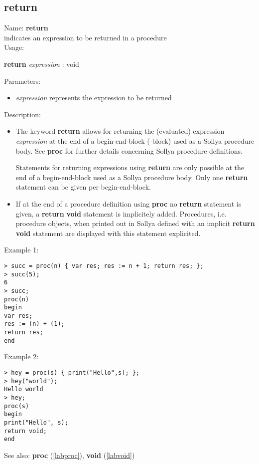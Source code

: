 \subsection{return}
\label{labreturn}
\noindent Name: \textbf{return}\\
indicates an expression to be returned in a procedure\\

\noindent Usage: 
\begin{center}
\textbf{return} \emph{expression} : \textsf{void}\\
\end{center}
Parameters: 
\begin{itemize}
\item \emph{expression} represents the expression to be returned
\end{itemize}
\noindent Description: \begin{itemize}

\item The keyword \textbf{return} allows for returning the (evaluated) expression
   \emph{expression} at the end of a begin-end-block ({}-block) used as a
   Sollya procedure body. See \textbf{proc} for further details concerning
   Sollya procedure definitions.
    
   Statements for returning expressions using \textbf{return} are only possible
    at the end of a begin-end-block used as a Sollya procedure
    body. Only one \textbf{return} statement can be given per begin-end-block.

\item If at the end of a procedure definition using \textbf{proc} no \textbf{return}
   statement is given, a \textbf{return} \textbf{void} statement is implicitely
   added. Procedures, i.e. procedure objects, when printed out in Sollya
   defined with an implicit \textbf{return} \textbf{void} statement are displayed with
   this statement explicited.
\end{itemize}
\noindent Example 1: 
\begin{center}\begin{minipage}{15cm}\begin{Verbatim}[frame=single]
> succ = proc(n) { var res; res := n + 1; return res; };
> succ(5);
6
> succ;
proc(n)
begin
var res;
res := (n) + (1);
return res;
end
\end{Verbatim}
\end{minipage}\end{center}
\noindent Example 2: 
\begin{center}\begin{minipage}{15cm}\begin{Verbatim}[frame=single]
> hey = proc(s) { print("Hello",s); };
> hey("world");
Hello world
> hey;
proc(s)
begin
print("Hello", s);
return void;
end
\end{Verbatim}
\end{minipage}\end{center}
See also: \textbf{proc} (\ref{labproc}), \textbf{void} (\ref{labvoid})

